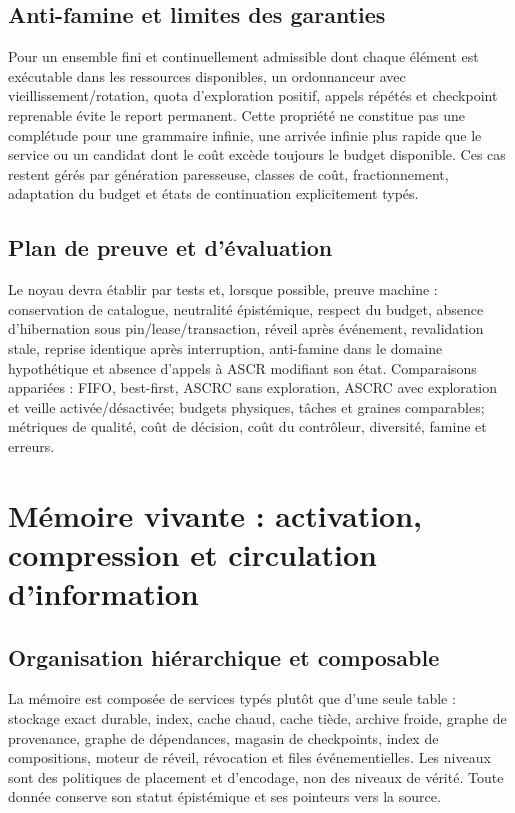 \documentclass[11pt,a4paper]{article}
\begin{document}
\subsection{Anti-famine et limites des garanties}
Pour un ensemble fini et continuellement admissible dont chaque élément est exécutable dans les ressources disponibles, un ordonnanceur avec vieillissement/rotation, quota d'exploration positif, appels répétés et checkpoint reprenable évite le report permanent. Cette propriété ne constitue pas une complétude pour une grammaire infinie, une arrivée infinie plus rapide que le service ou un candidat dont le coût excède toujours le budget disponible. Ces cas restent gérés par génération paresseuse, classes de coût, fractionnement, adaptation du budget et états de continuation explicitement typés.

\subsection{Plan de preuve et d'évaluation}
Le noyau devra établir par tests et, lorsque possible, preuve machine : conservation de catalogue, neutralité épistémique, respect du budget, absence d'hibernation sous pin/lease/transaction, réveil après événement, revalidation stale, reprise identique après interruption, anti-famine dans le domaine hypothétique et absence d'appels à ASCR modifiant son état. Comparaisons appariées : FIFO, best-first, ASCRC sans exploration, ASCRC avec exploration et veille activée/désactivée; budgets physiques, tâches et graines comparables; métriques de qualité, coût de décision, coût du contrôleur, diversité, famine et erreurs.

\section{Mémoire vivante : activation, compression et circulation d'information}
\subsection{Organisation hiérarchique et composable}
La mémoire est composée de services typés plutôt que d'une seule table : stockage exact durable, index, cache chaud, cache tiède, archive froide, graphe de provenance, graphe de dépendances, magasin de checkpoints, index de compositions, moteur de réveil, révocation et files événementielles. Les niveaux sont des politiques de placement et d'encodage, non des niveaux de vérité. Toute donnée conserve son statut épistémique et ses pointeurs vers la source.
\end{document}

